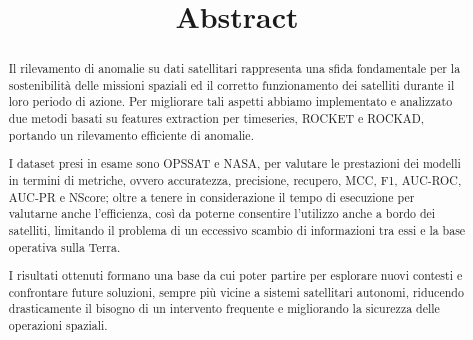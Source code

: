 \title{Abstract}
\begin{abstract}
    Il rilevamento di anomalie su dati satellitari rappresenta una sfida fondamentale per la sostenibilità delle missioni spaziali ed il corretto funzionamento dei satelliti durante il loro periodo di azione.
    Per migliorare tali aspetti abbiamo implementato e analizzato due metodi basati su features extraction per timeseries, ROCKET e ROCKAD, portando un rilevamento efficiente di anomalie.

    I dataset presi in esame sono OPS\textunderscore SAT e NASA, per valutare le prestazioni dei modelli in termini di metriche, ovvero accuratezza, precisione, recupero, MCC, F1, AUC-ROC, AUC-PR e NScore; oltre a tenere in considerazione il tempo di esecuzione per valutarne anche l'efficienza, così da poterne consentire l'utilizzo anche a bordo dei satelliti, limitando il problema di un eccessivo scambio di informazioni tra essi e la base operativa sulla Terra.

    I risultati ottenuti formano una base da cui poter partire per esplorare nuovi contesti e confrontare future soluzioni, sempre più vicine a sistemi satellitari autonomi, riducendo drasticamente il bisogno di un intervento frequente e migliorando la sicurezza delle operazioni spaziali.
\end{abstract}
